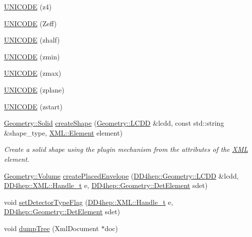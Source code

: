 \begin{DoxyCompactItemize}
\item 
\hyperlink{namespace_d_d4hep_1_1_x_m_l_a5ea84bd5d6f342844d4fc802ef894d27}{UNICODE} (z4)
\item 
\hyperlink{namespace_d_d4hep_1_1_x_m_l_adf7145cba0776b8d13c36a3953ceb5aa}{UNICODE} (Zeff)
\item 
\hyperlink{namespace_d_d4hep_1_1_x_m_l_acb3ba2b30fc54625de6aa6c0dd45d3a3}{UNICODE} (zhalf)
\item 
\hyperlink{namespace_d_d4hep_1_1_x_m_l_a61ebecd796133faad9152ad05ff1cfbe}{UNICODE} (zmin)
\item 
\hyperlink{namespace_d_d4hep_1_1_x_m_l_ac3e72298cb24ad438bc1d8da3809818f}{UNICODE} (zmax)
\item 
\hyperlink{namespace_d_d4hep_1_1_x_m_l_abcce90e734149af85c0b827e5032b948}{UNICODE} (zplane)
\item 
\hyperlink{namespace_d_d4hep_1_1_x_m_l_a6b62c36d475b192d72112297dec6bb5f}{UNICODE} (zstart)
\item 
\hyperlink{class_d_d4hep_1_1_geometry_1_1_solid__type}{Geometry::Solid} \hyperlink{namespace_d_d4hep_1_1_x_m_l_a8ff2032ce30be011dde0b5696701605f}{createShape} (\hyperlink{class_d_d4hep_1_1_geometry_1_1_l_c_d_d}{Geometry::LCDD} \&lcdd, const std::string \&shape\_\-type, \hyperlink{class_d_d4hep_1_1_x_m_l_1_1_element}{XML::Element} element)
\begin{DoxyCompactList}\small\item\em Create a solid shape using the plugin mechanism from the attributes of the \hyperlink{namespace_d_d4hep_1_1_x_m_l}{XML} element. \item\end{DoxyCompactList}\item 
\hyperlink{class_d_d4hep_1_1_geometry_1_1_volume}{Geometry::Volume} \hyperlink{namespace_d_d4hep_1_1_x_m_l_a242bb35f6c983f400a35ef28e873267a}{createPlacedEnvelope} (\hyperlink{class_d_d4hep_1_1_geometry_1_1_l_c_d_d}{DD4hep::Geometry::LCDD} \&lcdd, \hyperlink{class_d_d4hep_1_1_x_m_l_1_1_handle__t}{DD4hep::XML::Handle\_\-t} e, \hyperlink{class_d_d4hep_1_1_geometry_1_1_det_element}{DD4hep::Geometry::DetElement} sdet)
\item 
void \hyperlink{namespace_d_d4hep_1_1_x_m_l_ae5c379820b07798a4c0af10b83fd2ad0}{setDetectorTypeFlag} (\hyperlink{class_d_d4hep_1_1_x_m_l_1_1_handle__t}{DD4hep::XML::Handle\_\-t} e, \hyperlink{class_d_d4hep_1_1_geometry_1_1_det_element}{DD4hep::Geometry::DetElement} sdet)
\item 
void \hyperlink{namespace_d_d4hep_1_1_x_m_l_a7cf74afac9d5989eb5eb2862e9ae78b3}{dumpTree} (XmlDocument $\ast$doc)

\end{DoxyCompactItemize}
